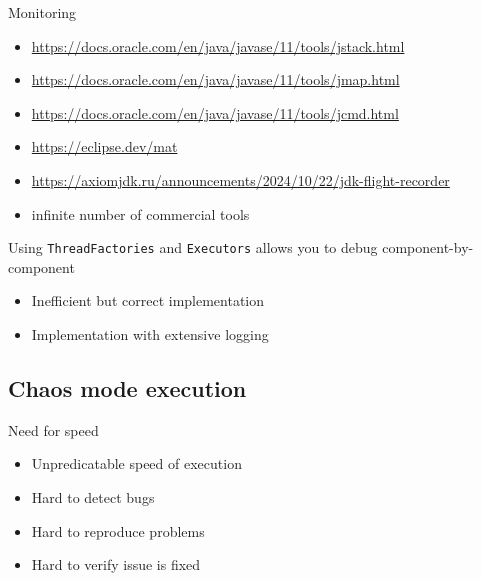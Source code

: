 \begin{frame}{Monitoring}

\begin{itemize}
  \item \url{https://docs.oracle.com/en/java/javase/11/tools/jstack.html}
  \item \url{https://docs.oracle.com/en/java/javase/11/tools/jmap.html}
  \item \url{https://docs.oracle.com/en/java/javase/11/tools/jcmd.html}
  \item \url{https://eclipse.dev/mat}
  \item \url{https://axiomjdk.ru/announcements/2024/10/22/jdk-flight-recorder}
  \item infinite number of commercial tools
\end{itemize}

\pause

Using \texttt{ThreadFactories} and \texttt{Executors} allows you to debug component-by-component
\begin{itemize}
  \item Inefficient but correct implementation
  \item Implementation with extensive logging
\end{itemize}

\end{frame}

\subsection{Chaos mode execution}
\showTOCSub

\painpointsslide

\begin{frame}[t]{Need for speed}

\begin{itemize}
  \item Unpredicatable speed of execution
\end{itemize}

\pause

\begin{itemize}
  \item Hard to detect bugs
  \item Hard to reproduce problems
  \item Hard to verify issue is fixed
\end{itemize}

\end{frame}  

